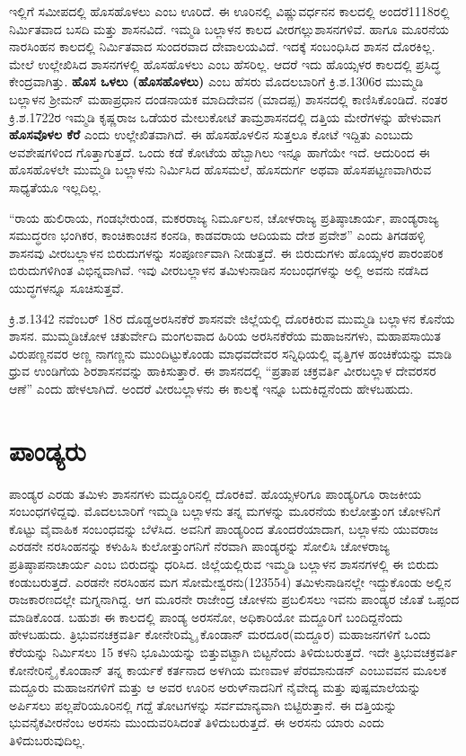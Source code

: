 ಇಲ್ಲಿಗೆ ಸಮೀಪದಲ್ಲಿ ಹೊಸಹೊಳಲು ಎಂಬ ಊರಿದೆ. ಈ ಊರಿನಲ್ಲಿ ವಿಷ್ಣುವರ್ಧನನ ಕಾಲದಲ್ಲಿ ಅಂದರೆ1118ರಲ್ಲಿ ನಿರ್ಮಿತವಾದ ಬಸದಿ ಮತ್ತು ಶಾಸನವಿದೆ. ಇಮ್ಮಡಿ ಬಲ್ಲಾಳನ ಕಾಲದ ವೀರಗಲ್ಲುಶಾಸನಗಳಿವೆ. ಹಾಗೂ ಮೂರನೆಯ ನಾರಸಿಂಹನ ಕಾಲದಲ್ಲಿ ನಿರ್ಮಿತವಾದ ಸುಂದರವಾದ ದೇವಾಲಯವಿದೆ. ಇದಕ್ಕೆ ಸಂಬಂಧಿಸಿದ ಶಾಸನ ದೊರಕಿಲ್ಲ. ಮೇಲೆ ಉಲ್ಲೇಖಿಸಿದ ಶಾಸನಗಳಲ್ಲಿ ಹೊಸಹೊಳಲು ಎಂಬ ಹೆಸರಿಲ್ಲ. ಆದರೆ ಇದು ಹೊಯ್ಸಳರ ಕಾಲದಲ್ಲಿ ಪ್ರಸಿದ್ಧ ಕೇಂದ್ರವಾಗಿತ್ತು. \textbf{ಹೊಸ ಒಳಲು (ಹೊಸಹೊಳಲು)} ಎಂಬ ಹೆಸರು ಮೊದಲಬಾರಿಗೆ ಕ್ರಿ.ಶ.1306ರ ಮುಮ್ಮಡಿ ಬಲ್ಲಾಳನ ಶ‍್ರೀಮನ್​ ಮಹಾಪ್ರಧಾನ ದಂಡನಾಯಕ ಮಾದಿದೇವನ (ಮಾದಪ್ಪ) ಶಾಸನದಲ್ಲಿ ಕಾಣಿಸಿಕೊಂಡಿದೆ. ನಂತರ ಕ್ರಿ.ಶ.1722ರ ಇಮ್ಮಡಿ ಕೃಷ್ಣರಾಜ ಒಡೆಯರ ಮೇಲುಕೋಟೆ ತಾಮ್ರಶಾಸನದಲ್ಲಿ ದತ್ತಿಯ ಮೇರೆಗಳನ್ನು ಹೇಳುವಾಗ \textbf{ಹೊಸವೊಳಲ ಕೆರೆ} ಎಂದು ಉಲ್ಲೇಖಿತವಾಗಿದೆ. ಈ ಹೊಸಹೊಳಲಿನ ಸುತ್ತಲೂ ಕೋಟೆ ಇದ್ದಿತು ಎಂಬುದು ಅವಶೇಷಗಳಿಂದ ಗೊತ್ತಾಗುತ್ತದೆ. ಒಂದು ಕಡೆ ಕೋಟೆಯ ಹೆಬ್ಬಾಗಿಲು ಇನ್ನೂ ಹಾಗೆಯೇ ಇದೆ. ಆದುರಿಂದ ಈ ಹೊಸಹೊಳಲೇ ಮುಮ್ಮಡಿ ಬಲ್ಲಾಳನು ನಿರ್ಮಿಸಿದ ಹೊಸಮಲೆ, ಹೊಸದುರ್ಗ ಅಥವಾ ಹೊಸಪಟ್ಟಣವಾಗಿರುವ ಸಾಧ್ಯತೆಯೂ ಇಲ್ಲದಿಲ್ಲ.

“ರಾಯ ಹುಲಿರಾಯ, ಗಂಡಭೇರುಂಡ, ಮಕರರಾಜ್ಯ ನಿರ್ಮೂಲನ, ಚೋಳರಾಜ್ಯ ಪ್ರತಿಷ್ಠಾಚಾರ್ಯ, ಪಾಂಡ್ಯರಾಜ್ಯ ಸಮುದ್ಧರಣ ಭಂಗಿಕರ, ಕಾಂಚಿಕಾಂಚನ ಕಂನಡಿ, ಕಾಡವರಾಯ ಆದಿಯಮ ದೇಶ ಪ್ರವೇಶ” ಎಂದು ತಿಗಡಹಳ್ಳಿ ಶಾಸನವು ವೀರಬಲ್ಲಾಳನ ಬಿರುದುಗಳನ್ನು ಸಂಪೂರ್ಣವಾಗಿ ನೀಡುತ್ತದೆ. ಈ ಬಿರುದುಗಳು ಹೊಯ್ಸಳರ ಪಾರಂಪರಿಕ ಬಿರುದುಗಳಿಗಿಂತ ವಿಭಿನ್ನವಾಗಿವೆ. ಇವು ವೀರಬಲ್ಲಾಳನ ತಮಿಳುನಾಡಿನ ಸಂಬಂಧಗಳನ್ನು ಅಲ್ಲಿ ಅವನು ನಡೆಸಿದ ಯುದ್ಧಗಳನ್ನೂ ಸೂಚಿಸುತ್ತವೆ. 

ಕ್ರಿ.ಶ.1342 ನವೆಂಬರ್​ 18ರ ದೊಡ್ಡಅರಸಿನಕೆರೆ ಶಾಸನವೇ ಜಿಲ್ಲೆಯಲ್ಲಿ ದೊರಕಿರುವ ಮುಮ್ಮಡಿ ಬಲ್ಲಾಳನ ಕೊನೆಯ ಶಾಸನ. ಮುಮ್ಮಡಿಚೋಳ ಚತುರ್ವೇದಿ ಮಂಗಲವಾದ ಹಿರಿಯ ಅರಸಿನಕೆರೆಯ ಮಹಾಜನಗಳು, ಮಹಾಪಸಾಯಿತ ವಿರುಪಣ್ಣನವರ ಅಣ್ಣ ನಾಗಣ್ಣನು ಮುಂದಿಟ್ಟುಕೊಂಡು ಮಾಧವದೇವರ ಸನ್ನಿಧಿಯಲ್ಲಿ ವೃತ್ತಿಗಳ ಹಂಚಿಕೆಯನ್ನು ಮಾಡಿ ಧ್ರುವ ಉಂಡಿಗೆಯ ಶಿರಶಾಸನವನ್ನು ಹಾಕಿಸುತ್ತಾರೆ. ಈ ಶಾಸನದಲ್ಲಿ “ಪ್ರತಾಪ ಚಕ್ರವರ್ತಿ ವೀರಬಲ್ಲಾಳ ದೇವರಸರ ಆಣೆ” ಎಂದು ಹೇಳಲಾಗಿದೆ. ಅಂದರೆ ವೀರಬಲ್ಲಾಳನು ಈ ಕಾಲಕ್ಕೆ ಇನ್ನೂ ಬದುಕಿದ್ದನೆಂದು ಹೇಳಬಹುದು.


\section{ಪಾಂಡ್ಯರು}

ಪಾಂಡ್ಯರ ಎರಡು ತಮಿಳು ಶಾಸನಗಳು ಮದ್ದೂರಿನಲ್ಲಿ ದೊರಕಿವೆ. ಹೊಯ್ಸಳರಿಗೂ ಪಾಂಡ್ಯರಿಗೂ ರಾಜಕೀಯ ಸಂಬಂಧಗಳಿ\-ದ್ದವು. ಮೊದಲಬಾರಿಗೆ ಇಮ್ಮಡಿ ಬಲ್ಲಾಳನು ತನ್ನ ಮಗಳನ್ನು ಮೂರನೆಯ ಕುಲೋತ್ತುಂಗ ಚೋಳನಿಗೆ ಕೊಟ್ಟು ವೈವಾಹಿಕ ಸಂಬಂಧವನ್ನು ಬೆಳೆಸಿದ. ಅವನಿಗೆ ಪಾಂಡ್ಯರಿಂದ ತೊಂದರೆಯಾದಾಗ, ಬಲ್ಲಾಳನು ಯುವರಾಜ ಎರಡನೇ ನರಸಿಂಹನನ್ನು ಕಳುಹಿಸಿ ಕುಲೋತ್ತುಂಗನಿಗೆ ನೆರವಾಗಿ ಪಾಂಡ್ಯರನ್ನು ಸೋಲಿಸಿ ಚೋಳರಾಜ್ಯ ಪ್ರತಿಷ್ಠಾಪನಾಚಾರ್ಯ ಎಂಬ ಬಿರುದನ್ನು ಧರಿಸಿದ. ಜಿಲ್ಲೆಯಲ್ಲಿರುವ ಇಮ್ಮಡಿ ಬಲ್ಲಾಳನ ಶಾಸನಗಳಲ್ಲಿ ಈ ಬಿರುದು ಕಂಡುಬರುತ್ತದೆ. ಎರಡನೇ ನರಸಿಂಹನ ಮಗ ಸೋಮೇಶ್ವರನು(123554) ತಮಿಳುನಾಡಿನಲ್ಲೇ ಇದ್ದುಕೊಂಡು ಅಲ್ಲಿನ ರಾಜಕಾರಣದಲ್ಲೇ ಮಗ್ನನಾಗಿದ್ದ. ಆಗ ಮೂರನೇ ರಾಜೇಂದ್ರ ಚೋಳನು ಪ್ರಬಲಿಸಲು ಇವನು ಪಾಂಡ್ಯರ ಜೊತೆ ಒಪ್ಪಂದ ಮಾಡಿಕೊಂಡ. ಬಹುಶಃ ಈ ಕಾಲದಲ್ಲಿ ಪಾಂಡ್ಯ ಅರಸನೋ, ಅಧಿಕಾರಿಯೋ ಮದ್ದೂರಿಗೆ ಬಂದಿದ್ದನೆಂದು ಹೇಳಬಹುದು. ತ್ರಿಭುವನಚಕ್ರವರ್ತಿ ಕೋನೇರಿಮ್ಮೈ ಕೊಂಡಾನ್​ ಮರದೂರ(ಮದ್ದೂರ) ಮಹಾಜನಗಳಿಗೆ ಒಂದು ಕೆರೆಯನ್ನು ನಿರ್ಮಿಸಲು 15 ಕಳನಿ ಭೂಮಿಯನ್ನು ಬಿತ್ತುವಟ್ಟಾಗಿ ಬಿಟ್ಟನೆಂದು ತಿಳಿದುಬರುತ್ತದೆ. ಇದೇ ತ್ರಿಭುವಚಕ್ರವರ್ತಿ ಕೋನೇರಿನ್ಮೈ ಕೊಂಡಾನ್​ ತನ್ನ ಕಾರ್ಯಕೆ ಕರ್ತನಾದ ಅಳಗಿಯ ಮಣವಾಳ ಪೆರಮಾನುಡನ್​ ಎಂಬುವವನ ಮೂಲಕ ಮದ್ದೂರು ಮಹಾಜನಗಳಿಗೆ ಮತ್ತು ಆ ಅವರ ಊರಿನ ಅರುಳ್​ನಾದನಿಗೆ ನೈವೇದ್ಯ ಮತ್ತು ಪುಷ್ಪಮಾಲೆಯನ್ನು ಅರ್ಪಿಸಲು ಪಲ್ಲಪೆರಿಯೂರಿನಲ್ಲಿ ಗದ್ದೆ ತೋಟಗಳನ್ನು ಸರ್ವಮಾನ್ಯವಾಗಿ ಬಿಟ್ಟಿರುತ್ತಾನೆ. ಈ ದತ್ತಿಯನ್ನು ಭುವನೈಕವೀರನೆಂಬ ಅರಸನು ಮುಂದುವರಿಸಿದಂತೆ ತಿಳಿದುಬರುತ್ತದೆ. ಈ ಅರಸನು ಯಾರು ಎಂದು ತಿಳಿದುಬರುವುದಿಲ್ಲ.


